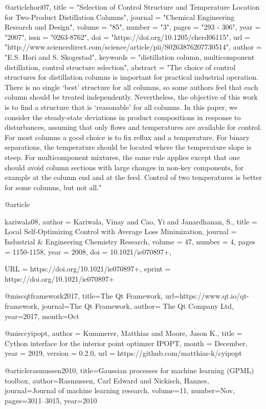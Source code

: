 @article{hori07,
title = "Selection of Control Structure and Temperature Location for Two-Product Distillation Columns",
journal = "Chemical Engineering Research and Design",
volume = "85",
number = "3",
pages = "293 - 306",
year = "2007",
issn = "0263-8762",
doi = "https://doi.org/10.1205/cherd06115",
url = "http://www.sciencedirect.com/science/article/pii/S0263876207730514",
author = "E.S. Hori and S. Skogestad",
keywords = "distillation column, multicomponent distillation, control structure selection",
abstract = "The choice of control structures for distillation columns is important for practical industrial operation. There is no single ‘best’ structure for all columns, so some authors feel that each column should be treated independently. Nevertheless, the objective of this work is to find a structure that is ‘reasonable’ for all columns. In this paper, we consider the steady-state deviations in product compositions in response to disturbances, assuming that only flows and temperatures are available for control. For most columns a good choice is to fix reflux and a temperature. For binary separations, the temperature should be located where the temperature slope is steep. For multicomponent mixtures, the same rule applies except that one should avoid column sections with large changes in non-key components, for example at the column end and at the feed. Control of two temperatures is better for some columns, but not all."
}

@article{kariwala08,
author = {Kariwala, Vinay and Cao, Yi and Janardhanan, S.},
title = {Local Self-Optimizing Control with Average Loss Minimization},
journal = {Industrial \& Engineering Chemistry Research},
volume = {47},
number = {4},
pages = {1150-1158},
year = {2008},
doi = {10.1021/ie070897+},

URL = {https://doi.org/10.1021/ie070897+},
eprint = {https://doi.org/10.1021/ie070897+}
}

@misc{qtframework2017, 
title={{The Qt Framework}}, 
url={https://www.qt.io/qt-framework}, 
journal={The Qt Framework}, 
author= {{The Qt Company Ltd}}, 
year={2017}, 
month={Oct}
}

@misc{cyipopt,
author       = {Kummerer, Matthias and Moore, Jason K.},
title        = {{Cython interface for the interior point optimzer IPOPT}},
month        = {December},
year         = {2019},
version      = {0.2.0},
url          = {https://github.com/matthias-k/cyipopt}
}

@article{rasmussen2010,
  title={Gaussian processes for machine learning (GPML) toolbox},
  author={Rasmussen, Carl Edward and Nickisch, Hannes},
  journal={Journal of machine learning research},
  volume={11},
  number={Nov},
  pages={3011--3015},
  year={2010}
}

